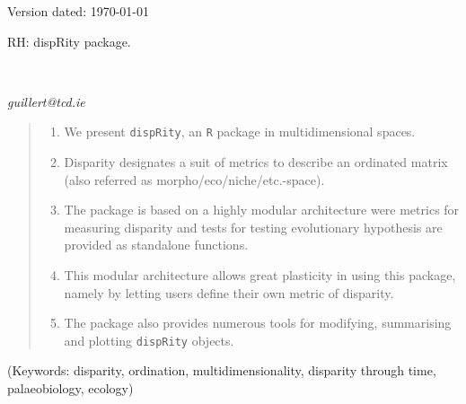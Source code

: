 \documentclass[12pt,letterpaper]{article}
\begin{document}
\begin{flushright}
Version dated: \today
\end{flushright}
\bigskip
\noindent RH: dispRity package.

\bigskip
\medskip
\begin{center}

\bigskip

\\
\end{center}
\medskip
{} \textit{guillert@tcd.ie}\\  
\vspace{1in}

\modulolinenumbers[1]
\linenumbers

%
%

\newpage
\begin{abstract}

\begin{enumerate}
    \item We present \texttt{dispRity}, an \texttt{R} package in multidimensional spaces. 
    \item Disparity designates a suit of metrics to describe an ordinated matrix (also referred as morpho/eco/niche/etc.-space).
    \item The package is based on a highly modular architecture were metrics for measuring disparity and tests for testing evolutionary hypothesis are provided as standalone functions.
    \item This modular architecture allows great plasticity in using this package, namely by letting users define their own metric of disparity.
    \item The package also provides numerous tools for modifying, summarising and plotting \texttt{dispRity} objects.
\end{enumerate}

\end{abstract}

\noindent (Keywords: disparity, ordination, multidimensionality, disparity through time, palaeobiology, ecology)\\
\end{document}
